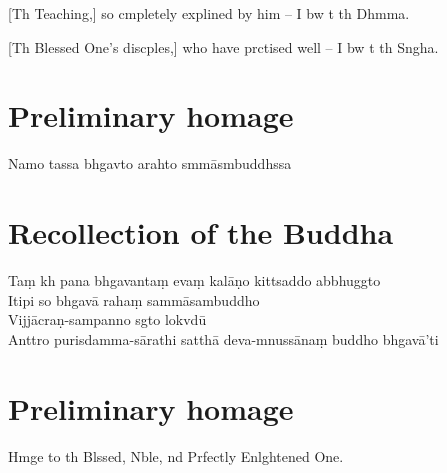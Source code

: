 [Th Teaching,] so cmpletely explined by him --
I bw t th Dhmma. 

[Th Blessed One's discples,] who have prctised well --
I bw t th Sngha. 

\clearpage

\chapter{Preliminary homage}

\begin{leader}
\end{leader}

Namo tassa bhgavto arahto smmāsmbuddhssa


\chapter{Recollection of the Buddha}

\begin{leader}
\end{leader}

Taṃ kh pana bhgavantaṃ evaṃ kalāṇo kittsaddo abbhuggto\\
Itipi so bhgavā rahaṃ sammāsambuddho\\
Vijjācraṇ-sampanno sgto lokvdū\\
Anttro purisdamma-sārathi satthā deva-mnussānaṃ buddho bhgavā'ti

\clearpage

\chapter{Preliminary homage}

\begin{leader}
\end{leader}

Hmge to th Blssed, Nble, nd Prfectly Enlghtened One.


